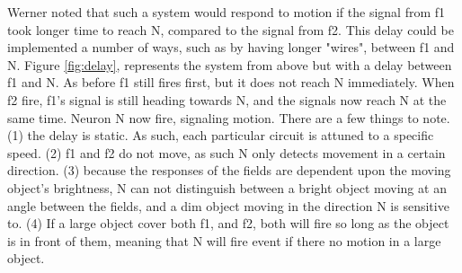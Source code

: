 \documentclass[11pt,a4paper,oneside,table,xcdraw]{article}
\begin{document}
Werner \cite{beetle} noted that such a system would respond to motion if the signal from f1 took longer time to reach N, compared to the signal from f2. This delay could be implemented a number of ways, such as by having longer "wires", between f1 and N. Figure \ref{fig:delay}, represents the system from above but with a delay between f1 and N. As before f1 still fires first, but it does not reach N immediately. When f2 fire, f1's signal is still heading towards N, and the signals now reach N at the same time. Neuron N now fire, signaling motion. There are a few things to note. (1) the delay is static. As such, each particular circuit is attuned to a specific speed. (2) f1 and f2 do not move, as such N only detects movement in a certain direction. (3) because the responses of the fields are dependent upon the moving object's brightness, N can not distinguish between a bright object moving at an angle between the fields, and a dim object moving in the direction N is sensitive to. (4) If a large  object cover both f1, and f2, both will fire so long as the object is in front of them, meaning that N will fire event if there no motion in a large object.
\end{document}

